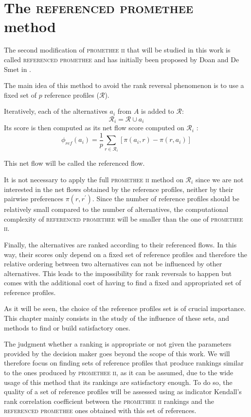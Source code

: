 \chapter{The \textsc{referenced promethee} method}

The second modification of \textsc{promethee ii} that will be studied in this work is called \textsc{referenced promethee} and has initially been proposed by Doan and De Smet in \cite{RefPII}.

The main idea of this method to avoid the rank reversal phenomenon is to use a fixed set of $p$ reference profiles ($\mathcal{R}$).

Iteratively, each of the alternatives $a_i$ from $A$ is added to $\mathcal{R} $\cite{RefPII}:
\begin{equation}
    \mathcal{R}_i = \mathcal{R} \cup a_i
    \label{eqn:reference_set_union_ai}
\end{equation}
Its score is then computed as its net flow score computed on $\mathcal{R}_i$ \cite{RefPII}:
\begin{equation}
    \phi_{ref}(a_i) = \frac{1}{p}\sum_{r \in \mathcal{R}_i} [\pi(a_i,r) - \pi(r, a_i)]
    \label{eqn:ref_flow}
\end{equation}

This net flow will be called the referenced flow.

It is not necessary to apply the full \textsc{promethee ii} method on $\mathcal{R}_i$ since we are not interested in the net flows obtained by the reference profiles, neither by their pairwise preferences $\pi(r, r^{\prime})$. 
Since the number of reference profiles should be relatively small compared to the number of alternatives, the computational complexity of \textsc{referenced promethee} will be smaller than the one of \textsc{promethee ii}.

Finally, the alternatives are ranked according to their referenced flows.
In this way, their scores only depend on a fixed set of reference profiles and therefore the relative ordering between two alternatives can not be influenced by other alternatives. This leads to the impossibility for rank reversals to happen but comes with the additional cost of having to find a fixed and appropriated set of reference profiles.

As it will be seen, the choice of the reference profiles set is of crucial importance.
This chapter mainly consists in the study of the influence of these sets, and methods to find or build satisfactory ones.

The judgment whether a ranking is appropriate or not given the parameters provided by the decision maker goes beyond the scope of this work.
We will therefore focus on finding sets of reference profiles that produce rankings similar to the ones produced by \textsc{promethee ii}, as it can be assumed, due to the wide usage of this method that its rankings are satisfactory enough.
To do so, the quality of a set of reference profiles will be assessed using as indicator Kendall's rank correlation coefficient between the \textsc{promethee ii} rankings and the \textsc{referenced promethee} ones obtained with this set of references.

